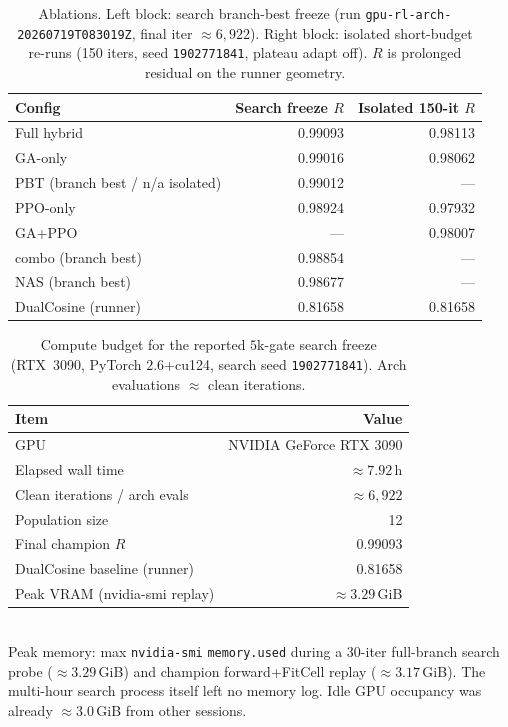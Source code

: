 \begin{table}[t]
  \centering
  \caption{Ablations. Left block: search branch-best freeze (run \texttt{gpu-rl-arch-20260719T083019Z}, final iter $\approx 6{,}922$). Right block: isolated short-budget re-runs (150 iters, seed \texttt{1902771841}, plateau adapt off). $R$ is prolonged residual on the runner geometry.}
  \label{tab:ablation}
  \setlength{\tabcolsep}{3pt}
  \begin{tabular}{@{}lrr@{}}
    \toprule
    Config & Search freeze $R$ & Isolated 150-it $R$ \\
    \midrule
    Full hybrid & 0.99093 & 0.98113 \\
    GA-only & 0.99016 & 0.98062 \\
    PBT (branch best / n/a isolated) & 0.99012 & --- \\
    PPO-only & 0.98924 & 0.97932 \\
    GA{+}PPO & --- & 0.98007 \\
    combo (branch best) & 0.98854 & --- \\
    NAS (branch best) & 0.98677 & --- \\
    DualCosine (runner) & 0.81658 & 0.81658 \\
    \bottomrule
  \end{tabular}
\end{table}

\begin{table}[t]
  \centering
  \caption{Compute budget for the reported $5$k-gate search freeze (RTX~3090, PyTorch $2.6$+cu124, search seed \texttt{1902771841}). Arch evaluations $\approx$ clean iterations.}
  \label{tab:compute}
  \setlength{\tabcolsep}{3pt}
  \begin{tabular}{@{}lr@{}}
    \toprule
    Item & Value \\
    \midrule
    GPU & NVIDIA GeForce RTX 3090 \\
    Elapsed wall time & $\approx 7.92$\,h \\
    Clean iterations / arch evals & $\approx 6{,}922$ \\
    Population size & 12 \\
    Final champion $R$ & 0.99093 \\
    DualCosine baseline (runner) & 0.81658 \\
    Peak VRAM (nvidia-smi replay) & $\approx 3.29$\,GiB \\
    \bottomrule
  \end{tabular}\\[0.4em]
  {\footnotesize Peak memory: max \texttt{nvidia-smi} \texttt{memory.used} during a 30-iter full-branch search probe ($\approx 3.29$\,GiB) and champion forward{+}FitCell replay ($\approx 3.17$\,GiB). The multi-hour search process itself left no memory log. Idle GPU occupancy was already $\approx 3.0$\,GiB from other sessions.}
\end{table}

